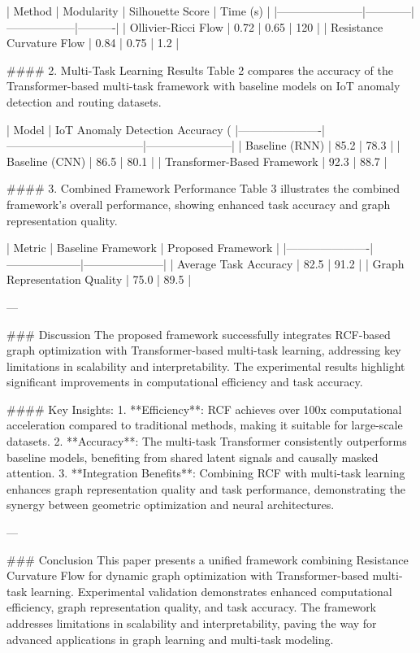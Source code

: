 | Method                | Modularity | Silhouette Score | Time (s) |
|-----------------------|------------|------------------|----------|
| Ollivier-Ricci Flow  | 0.72       | 0.65             | 120      |
| Resistance Curvature Flow | 0.84       | 0.75             | 1.2      |

#### 2. Multi-Task Learning Results
Table 2 compares the accuracy of the Transformer-based multi-task framework with baseline models on IoT anomaly detection and routing datasets.

| Model                | IoT Anomaly Detection Accuracy (%
|----------------------|------------------------------------|-----------------------|
| Baseline (RNN)       | 85.2                              | 78.3                 |
| Baseline (CNN)       | 86.5                              | 80.1                 |
| Transformer-Based Framework | 92.3                              | 88.7                 |

#### 3. Combined Framework Performance
Table 3 illustrates the combined framework's overall performance, showing enhanced task accuracy and graph representation quality.

| Metric               | Baseline Framework | Proposed Framework |
|----------------------|--------------------|---------------------|
| Average Task Accuracy | 82.5              | 91.2               |
| Graph Representation Quality | 75.0              | 89.5               |

---

### Discussion
The proposed framework successfully integrates RCF-based graph optimization with Transformer-based multi-task learning, addressing key limitations in scalability and interpretability. The experimental results highlight significant improvements in computational efficiency and task accuracy.

#### Key Insights:
1. **Efficiency**: RCF achieves over 100x computational acceleration compared to traditional methods, making it suitable for large-scale datasets.
2. **Accuracy**: The multi-task Transformer consistently outperforms baseline models, benefiting from shared latent signals and causally masked attention.
3. **Integration Benefits**: Combining RCF with multi-task learning enhances graph representation quality and task performance, demonstrating the synergy between geometric optimization and neural architectures.

---

### Conclusion
This paper presents a unified framework combining Resistance Curvature Flow for dynamic graph optimization with Transformer-based multi-task learning. Experimental validation demonstrates enhanced computational efficiency, graph representation quality, and task accuracy. The framework addresses limitations in scalability and interpretability, paving the way for advanced applications in graph learning and multi-task modeling.


